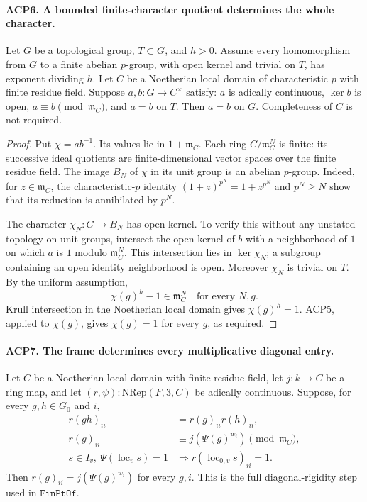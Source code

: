 \paragraph{ACP6. A bounded finite-character quotient determines the whole character.}
\label{claim:ACP6}
Let \(G\) be a topological group, \(T\subset G\), and \(h>0\).
Assume every homomorphism from \(G\) to a finite abelian
\(p\)-group, with open kernel and trivial on \(T\), has exponent
dividing \(h\).  Let \(C\) be a Noetherian local domain of
characteristic \(p\) with finite residue field.  Suppose
\(a,b:G\to C^\times\) satisfy:
\(a\) is adically continuous, \(\ker b\) is open,
\(a\equiv b\pmod{\mathfrak m_C}\), and \(a=b\) on \(T\).
Then \(a=b\) on \(G\).  Completeness of \(C\) is not required.

\begin{proof}
Put \(\chi=ab^{-1}\).  Its values lie in
\(1+\mathfrak m_C\).  Each ring
\(C/\mathfrak m_C^N\) is finite: its successive ideal
quotients are finite-dimensional vector spaces over the finite
residue field.  The image \(B_N\) of \(\chi\) in its unit
group is an abelian \(p\)-group.  Indeed, for
\(z\in\mathfrak m_C\), the characteristic-\(p\) identity
\((1+z)^{p^N}=1+z^{p^N}\) and \(p^N\ge N\) show that its
reduction is annihilated by \(p^N\).

The character \(\chi_N:G\to B_N\) has open kernel.
To verify this without any unstated topology on unit groups,
intersect the open kernel of \(b\) with a neighborhood of
\(1\) on which \(a\) is \(1\) modulo \(\mathfrak m_C^N\).
This intersection lies in \(\ker\chi_N\); a subgroup containing
an open identity neighborhood is open.  Moreover \(\chi_N\)
is trivial on \(T\).  By the uniform assumption,
\[
                  \chi(g)^h-1\in\mathfrak m_C^N
                  \quad\text{for every }N,g.
\]
Krull intersection in the Noetherian local domain gives
\(\chi(g)^h=1\).  ACP5, applied to \(\chi(g)\), gives
\(\chi(g)=1\) for every \(g\), as required.
\end{proof}

\paragraph{ACP7. The frame determines every multiplicative diagonal entry.}
\label{claim:ACP7}
Let \(C\) be a Noetherian local domain with finite residue field,
let \(j:k\to C\) be a ring map, and let
\((r,\psi):\mathrm{NRep}(F,3,C)\) be adically continuous.
Suppose, for every \(g,h\in G_0\) and \(i\),
\[
 \begin{split}
 r(gh)_{ii}&=r(g)_{ii}r(h)_{ii},\\
 r(g)_{ii}&\equiv j(\Psi(g)^{w_i})\pmod{\mathfrak m_C},\\
 s\in I_v,\ \Psi(\operatorname{loc}_v s)=1
       &\Longrightarrow r(\operatorname{loc}_{0,v}s)_{ii}=1.
 \end{split}                                             \tag{ACP.15}
\]
Then \(r(g)_{ii}=j(\Psi(g)^{w_i})\) for every \(g,i\).
This is the full diagonal-rigidity step used in
\(\texttt{FinPtOf}\).

